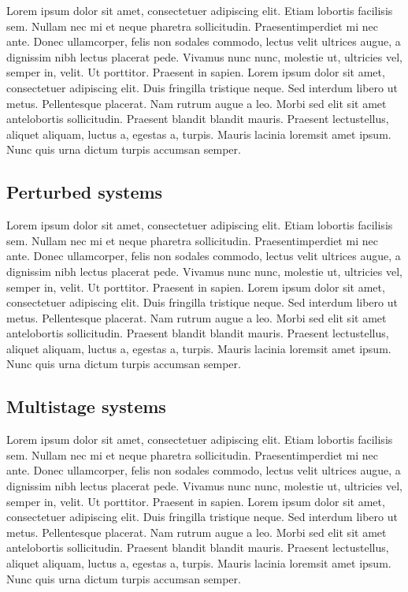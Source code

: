 Lorem ipsum dolor sit amet, consectetuer adipiscing elit. Etiam lobortis facilisis sem. Nullam nec mi et neque pharetra sollicitudin. Praesentimperdiet mi nec ante. Donec ullamcorper, felis non sodales commodo, lectus velit ultrices augue, a dignissim nibh lectus placerat pede. Vivamus nunc nunc, molestie ut, ultricies vel, semper in, velit. Ut porttitor. Praesent in sapien. Lorem ipsum dolor sit amet, consectetuer adipiscing elit. Duis fringilla tristique neque. Sed interdum libero ut metus. Pellentesque placerat. Nam rutrum augue a leo. Morbi sed elit sit amet antelobortis sollicitudin. Praesent blandit blandit mauris. Praesent lectustellus, aliquet aliquam, luctus a, egestas a, turpis. Mauris lacinia loremsit amet ipsum. Nunc quis urna dictum turpis accumsan semper.

\subsection{Perturbed systems}

Lorem ipsum dolor sit amet, consectetuer adipiscing elit. Etiam lobortis facilisis sem. Nullam nec mi et neque pharetra sollicitudin. Praesentimperdiet mi nec ante. Donec ullamcorper, felis non sodales commodo, lectus velit ultrices augue, a dignissim nibh lectus placerat pede. Vivamus nunc nunc, molestie ut, ultricies vel, semper in, velit. Ut porttitor. Praesent in sapien. Lorem ipsum dolor sit amet, consectetuer adipiscing elit. Duis fringilla tristique neque. Sed interdum libero ut metus. Pellentesque placerat. Nam rutrum augue a leo. Morbi sed elit sit amet antelobortis sollicitudin. Praesent blandit blandit mauris. Praesent lectustellus, aliquet aliquam, luctus a, egestas a, turpis. Mauris lacinia loremsit amet ipsum. Nunc quis urna dictum turpis accumsan semper.

\subsection{Multistage systems}

Lorem ipsum dolor sit amet, consectetuer adipiscing elit. Etiam lobortis facilisis sem. Nullam nec mi et neque pharetra sollicitudin. Praesentimperdiet mi nec ante. Donec ullamcorper, felis non sodales commodo, lectus velit ultrices augue, a dignissim nibh lectus placerat pede. Vivamus nunc nunc, molestie ut, ultricies vel, semper in, velit. Ut porttitor. Praesent in sapien. Lorem ipsum dolor sit amet, consectetuer adipiscing elit. Duis fringilla tristique neque. Sed interdum libero ut metus. Pellentesque placerat. Nam rutrum augue a leo. Morbi sed elit sit amet antelobortis sollicitudin. Praesent blandit blandit mauris. Praesent lectustellus, aliquet aliquam, luctus a, egestas a, turpis. Mauris lacinia loremsit amet ipsum. Nunc quis urna dictum turpis accumsan semper.


